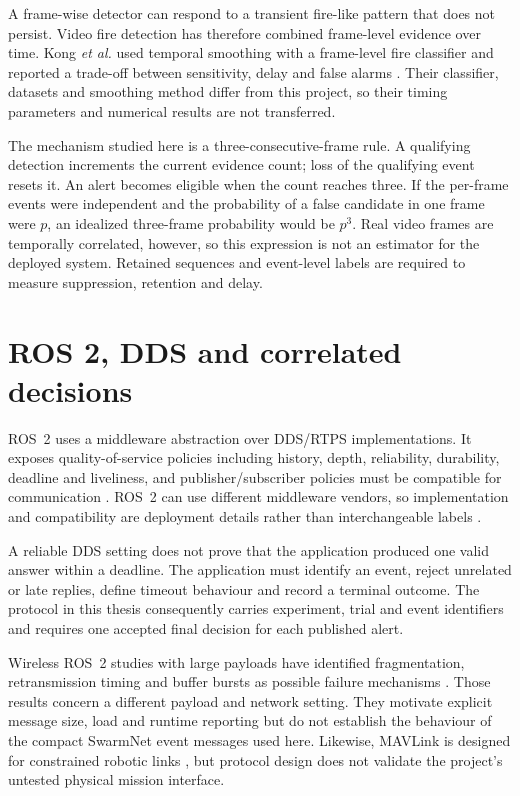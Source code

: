 A frame-wise detector can respond to a transient fire-like pattern that does
not persist. Video fire detection has therefore combined frame-level evidence
over time. Kong \emph{et al.} used temporal smoothing with a frame-level fire
classifier and reported a trade-off between sensitivity, delay and false
alarms \cite{Kong2016TemporalFire}. Their classifier, datasets and smoothing
method differ from this project, so their timing parameters and numerical
results are not transferred.

The mechanism studied here is a three-consecutive-frame rule. A qualifying
detection increments the current evidence count; loss of the qualifying event
resets it. An alert becomes eligible when the count reaches three. If the
per-frame events were independent and the probability of a false candidate in
one frame were \(p\), an idealized three-frame probability would be \(p^3\).
Real video frames are temporally correlated, however, so this expression is
not an estimator for the deployed system. Retained sequences and event-level
labels are required to measure suppression, retention and delay.

\section{ROS 2, DDS and correlated decisions}
\label{sec:background:ros2}

ROS~2 uses a middleware abstraction over DDS/RTPS implementations. It exposes
quality-of-service policies including history, depth, reliability, durability,
deadline and liveliness, and publisher/subscriber policies must be compatible
for communication \cite{OpenRoboticsROS2QoS}. ROS~2 can use different
middleware vendors, so implementation and compatibility are deployment
details rather than interchangeable labels \cite{OpenRoboticsRMW}.

A reliable DDS setting does not prove that the application produced one valid
answer within a deadline. The application must identify an event, reject
unrelated or late replies, define timeout behaviour and record a terminal
outcome. The protocol in this thesis consequently carries experiment, trial
and event identifiers and requires one accepted final decision for each
published alert.

Wireless ROS~2 studies with large payloads have identified fragmentation,
retransmission timing and buffer bursts as possible failure mechanisms
\cite{Lee2025ROS2Wireless}. Those results concern a different payload and
network setting. They motivate explicit message size, load and runtime
reporting but do not establish the behaviour of the compact SwarmNet event
messages used here. Likewise, MAVLink is designed for constrained robotic
links \cite{MAVLinkProtocolOverview}, but protocol design does not validate the
project's untested physical mission interface.

